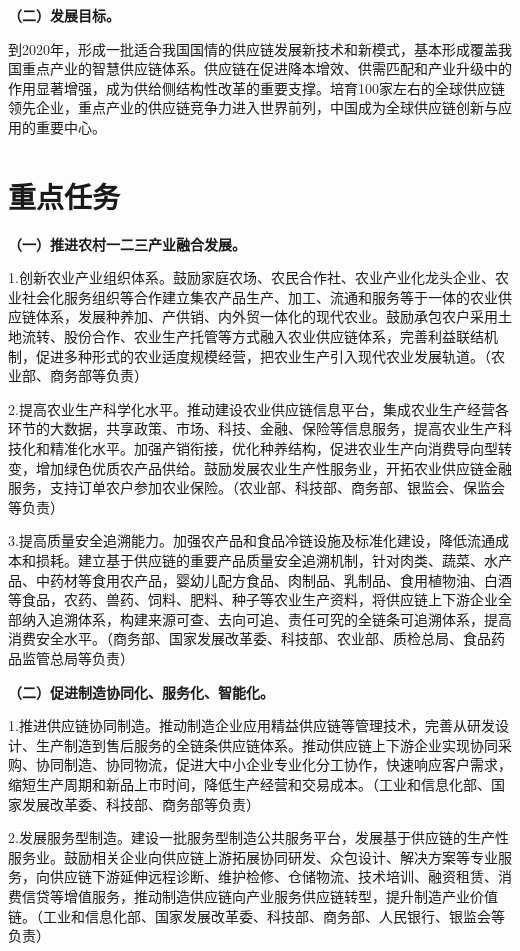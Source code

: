 { \bf （二）发展目标。 }

到2020年，形成一批适合我国国情的供应链发展新技术和新模式，基本形成覆盖我国重点产业的智慧供应链体系。供应链在促进降本增效、供需匹配和产业升级中的作用显著增强，成为供给侧结构性改革的重要支撑。培育100家左右的全球供应链领先企业，重点产业的供应链竞争力进入世界前列，中国成为全球供应链创新与应用的重要中心。

\section{重点任务}

{ \bf （一）推进农村一二三产业融合发展。 }

1.创新农业产业组织体系。鼓励家庭农场、农民合作社、农业产业化龙头企业、农业社会化服务组织等合作建立集农产品生产、加工、流通和服务等于一体的农业供应链体系，发展种养加、产供销、内外贸一体化的现代农业。鼓励承包农户采用土地流转、股份合作、农业生产托管等方式融入农业供应链体系，完善利益联结机制，促进多种形式的农业适度规模经营，把农业生产引入现代农业发展轨道。（农业部、商务部等负责）

2.提高农业生产科学化水平。推动建设农业供应链信息平台，集成农业生产经营各环节的大数据，共享政策、市场、科技、金融、保险等信息服务，提高农业生产科技化和精准化水平。加强产销衔接，优化种养结构，促进农业生产向消费导向型转变，增加绿色优质农产品供给。鼓励发展农业生产性服务业，开拓农业供应链金融服务，支持订单农户参加农业保险。（农业部、科技部、商务部、银监会、保监会等负责）

3.提高质量安全追溯能力。加强农产品和食品冷链设施及标准化建设，降低流通成本和损耗。建立基于供应链的重要产品质量安全追溯机制，针对肉类、蔬菜、水产品、中药材等食用农产品，婴幼儿配方食品、肉制品、乳制品、食用植物油、白酒等食品，农药、兽药、饲料、肥料、种子等农业生产资料，将供应链上下游企业全部纳入追溯体系，构建来源可查、去向可追、责任可究的全链条可追溯体系，提高消费安全水平。（商务部、国家发展改革委、科技部、农业部、质检总局、食品药品监管总局等负责）

{ \bf （二）促进制造协同化、服务化、智能化。 }

1.推进供应链协同制造。推动制造企业应用精益供应链等管理技术，完善从研发设计、生产制造到售后服务的全链条供应链体系。推动供应链上下游企业实现协同采购、协同制造、协同物流，促进大中小企业专业化分工协作，快速响应客户需求，缩短生产周期和新品上市时间，降低生产经营和交易成本。（工业和信息化部、国家发展改革委、科技部、商务部等负责）

2.发展服务型制造。建设一批服务型制造公共服务平台，发展基于供应链的生产性服务业。鼓励相关企业向供应链上游拓展协同研发、众包设计、解决方案等专业服务，向供应链下游延伸远程诊断、维护检修、仓储物流、技术培训、融资租赁、消费信贷等增值服务，推动制造供应链向产业服务供应链转型，提升制造产业价值链。（工业和信息化部、国家发展改革委、科技部、商务部、人民银行、银监会等负责）

